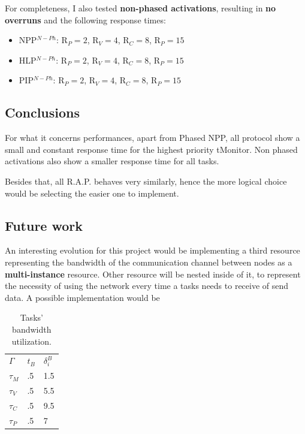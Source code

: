 \documentclass{article}
\begin{document}
For completeness, I also tested \textbf{non-phased activations}, resulting in \textbf{no overruns} and the following response times:

\begin{itemize}
    \item \begin{center}
            NPP$^{N-Ph}$: R$_{P}=2$, R$_{V}=4$, R$_{C}=8$, R$_{P}=15$
        \end{center}
    \item \begin{center}
            HLP$^{N-Ph}$: R$_{P}=2$, R$_{V}=4$, R$_{C}=8$, R$_{P}=15$
        \end{center}
    \item \begin{center}
            PIP$^{N-Ph}$: R$_{P}=2$, R$_{V}=4$, R$_{C}=8$, R$_{P}=15$
        \end{center}
\end{itemize}

\subsection{Conclusions}                                \label{conclusions}

For what it concerns performances, apart from Phased NPP, all protocol show a small and constant response time for the highest priority tMonitor. Non phased activations also show a smaller response time for all tasks.

Besides that, all R.A.P. behaves very similarly, hence the more logical choice would be selecting the easier one to implement.\\


\subsection{Future work}                                \label{future}

An interesting evolution for this project would be implementing a third resource representing the bandwidth of the communication channel between nodes as a  \textbf{multi-instance} resource. Other resource will be nested inside of it, to represent the necessity of using the network every time a tasks needs to receive of send data. A possible implementation would be

\begin{table}[H]                                    \label{tab_net}
  \centering
  \begin{tabular}{lll}
    $\Gamma$ &  $t_{B}$ & $\delta_{i}^{B}$\\
    \cmidrule(r){2-3}
    $\tau_{M}$ & .5 &  1.5\\
    $\tau_{V}$ & .5   & 5.5\\
    $\tau_{C}$ & .5   &  9.5\\
    $\tau_{P}$ & .5   &  7\\
    \bottomrule
  \end{tabular}
  \medskip{}
  \caption{Tasks' bandwidth utilization.}
  \medskip{}
\end{table}
\end{document}
